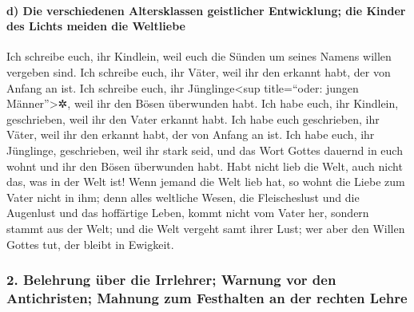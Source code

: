 \hypertarget{d-die-verschiedenen-altersklassen-geistlicher-entwicklung-die-kinder-des-lichts-meiden-die-weltliebe}{%
\paragraph{d) Die verschiedenen Altersklassen geistlicher Entwicklung;
die Kinder des Lichts meiden die
Weltliebe}\label{d-die-verschiedenen-altersklassen-geistlicher-entwicklung-die-kinder-des-lichts-meiden-die-weltliebe}}

 Ich schreibe euch, ihr Kindlein, weil euch die Sünden um
seines Namens willen vergeben sind.  Ich schreibe euch,
ihr Väter, weil ihr den erkannt habt, der von Anfang an ist. Ich
schreibe euch, ihr Jünglinge\textless sup title=``oder: jungen
Männer''\textgreater✲, weil ihr den Bösen überwunden habt. Ich habe
euch, ihr Kindlein, geschrieben, weil ihr den Vater erkannt habt.
 Ich habe euch geschrieben, ihr Väter, weil ihr den
erkannt habt, der von Anfang an ist. Ich habe euch, ihr Jünglinge,
geschrieben, weil ihr stark seid, und das Wort Gottes dauernd in euch
wohnt und ihr den Bösen überwunden habt.  Habt nicht lieb
die Welt, auch nicht das, was in der Welt ist! Wenn jemand die Welt lieb
hat, so wohnt die Liebe zum Vater nicht in ihm;  denn
alles weltliche Wesen, die Fleischeslust und die Augenlust und das
hoffärtige Leben, kommt nicht vom Vater her, sondern stammt aus der
Welt;  und die Welt vergeht samt ihrer Lust; wer aber den
Willen Gottes tut, der bleibt in Ewigkeit.

\hypertarget{belehrung-uxfcber-die-irrlehrer-warnung-vor-den-antichristen-mahnung-zum-festhalten-an-der-rechten-lehre}{%
\subsubsection{2. Belehrung über die Irrlehrer; Warnung vor den
Antichristen; Mahnung zum Festhalten an der rechten
Lehre}\label{belehrung-uxfcber-die-irrlehrer-warnung-vor-den-antichristen-mahnung-zum-festhalten-an-der-rechten-lehre}}

